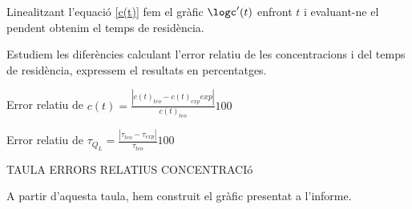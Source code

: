 \documentclass[10pt, twoside]{article}
\begin{document}
Linealitzant l'equació \eqref{c(t)} fem el gràfic $\logc'(t)$ enfront $t$ i evaluant-ne el pendent obtenim el temps de residència. 

Estudiem les diferències calculant l'error relatiu de les concentracions i del temps de residència, expressem el resultats en percentatges.

Error  relatiu  de  $c(t) = \frac{|c(t)_{teo} - c(t)_{exp} exp|}{c(t)_{teo}} 100$

Error relatiu de $\tau_{Q_L} = \frac{|\tau_{teo} - \tau_{exp}|}{\tau_{teo}} 100$

TAULA ERRORS RELATIUS CONCENTRACIó

A partir d'aquesta taula, hem construit el gràfic presentat a l'informe.
\end{document}
